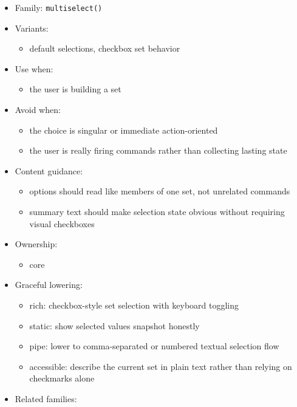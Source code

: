 \begin{itemize}
\tightlist
\item
  Family: \texttt{m\allowbreak{}u\allowbreak{}l\allowbreak{}t\allowbreak{}i\allowbreak{}s\allowbreak{}e\allowbreak{}l\allowbreak{}e\allowbreak{}c\allowbreak{}t\allowbreak{}(\allowbreak{})}
\item
  Variants:

  \begin{itemize}
  \tightlist
  \item
    default selections, checkbox set behavior
  \end{itemize}
\item
  Use when:

  \begin{itemize}
  \tightlist
  \item
    the user is building a set
  \end{itemize}
\item
  Avoid when:

  \begin{itemize}
  \tightlist
  \item
    the choice is singular or immediate action-oriented
  \item
    the user is really firing commands rather than collecting lasting state
  \end{itemize}
\item
  Content guidance:

  \begin{itemize}
  \tightlist
  \item
    options should read like members of one set, not unrelated commands
  \item
    summary text should make selection state obvious without requiring visual checkboxes
  \end{itemize}
\item
  Ownership:

  \begin{itemize}
  \tightlist
  \item
    core
  \end{itemize}
\item
  Graceful lowering:

  \begin{itemize}
  \tightlist
  \item
    rich: checkbox-style set selection with keyboard toggling
  \item
    static: show selected values snapshot honestly
  \item
    pipe: lower to comma-separated or numbered textual selection flow
  \item
    accessible: describe the current set in plain text rather than relying on checkmarks alone
  \end{itemize}
\item
  Related families:


\end{itemize}
